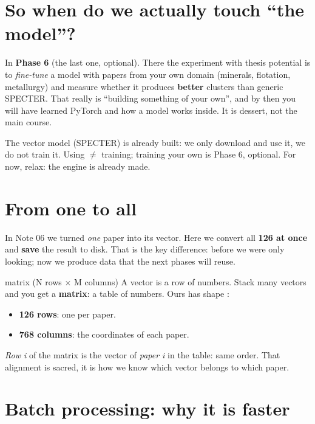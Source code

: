 \documentclass[11pt,a4paper]{article}
\begin{document}
\section{So when do we actually touch ``the model''?}

In \textbf{Phase 6} (the last one, optional). There the experiment with thesis potential is
to \emph{fine-tune} a model with papers from your own domain (minerals, flotation,
metallurgy) and measure whether it produces \textbf{better} clusters than generic SPECTER.
That really is ``building something of your own'', and by then you will have learned PyTorch
and how a model works inside. It is dessert, not the main course.

\begin{resumen}
The vector model (SPECTER) is already built: we only download and use it, we do not train it.
Using $\neq$ training; training your own is Phase 6, optional. For now, relax: the engine is
already made.
\end{resumen}
\clearpage
{}
{}

\section{From one to all}

In Note 06 we turned \emph{one} paper into its vector. Here we convert all \textbf{126 at
once} and \textbf{save} the result to disk. That is the key difference: before we were only
looking; now we produce data that the next phases will reuse.

\begin{concepto}{matrix (N rows $\times$ M columns)}
A vector is a row of numbers. Stack many vectors and you get a \textbf{matrix}: a table of
numbers. Ours has shape :
\begin{itemize}
  \item \textbf{126 rows}: one per paper.
  \item \textbf{768 columns}: the coordinates of each paper.
\end{itemize}
\emph{Row i} of the matrix is the vector of \emph{paper i} in the table: same order. That
alignment is sacred, it is how we know which vector belongs to which paper.
\end{concepto}

\section{Batch processing: why it is faster}
\end{document}
